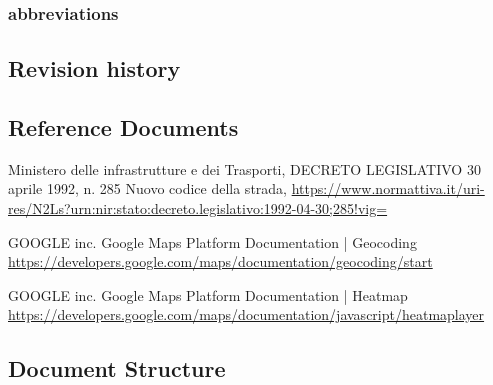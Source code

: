 \subsubsection{abbreviations}


\subsection{Revision history}


\subsection{Reference Documents}
\begin{thebibliography}{00}

 Ministero delle infrastrutture e dei Trasporti, DECRETO LEGISLATIVO 30 aprile 1992, n. 285 Nuovo codice della strada, \url{https://www.normattiva.it/uri-res/N2Ls?urn:nir:stato:decreto.legislativo:1992-04-30;285!vig=}

 GOOGLE inc. Google Maps Platform Documentation | Geocoding \url{https://developers.google.com/maps/documentation/geocoding/start}

 GOOGLE inc. Google Maps Platform Documentation | Heatmap \url{https://developers.google.com/maps/documentation/javascript/heatmaplayer}



\end{thebibliography}


\subsection{Document Structure}
